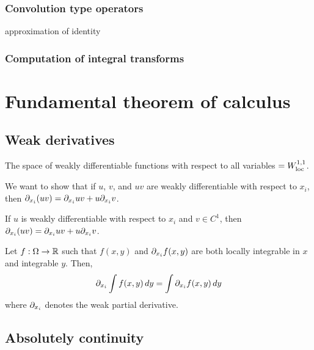 \documentclass{../note}
\begin{document}
\section{Convolution type operators}
approximation of identity

\section{Computation of integral transforms}











\part{Fundamental theorem of calculus}

\chapter{Weak derivatives}

The space of weakly differentiable functions with respect to all variables $=W_{\mathrm{loc}}^{1,1}$.

\begin{prb}
We want to show that if $u$, $v$, and $uv$ are weakly differentiable with respect to $x_i$, then $\pd_{x_i}(uv)=\pd_{x_i}uv+u\pd_{x_i}v$.
\begin{parts}
\item If $u$ is weakly differentiable with respect to $x_i$ and $v\in C^1$, then $\pd_{x_i}(uv)=\pd_{x_i}uv+u\pd_{x_i}v$.
\end{parts}
\end{prb}


\begin{prb}
Let $f:\Omega\to\mathbb{R}$
such that $f(x,y)$ and $\pd_{x_i}f(x,y)$ are both locally integrable in $x$ and integrable $y$.
Then,
\[\pd_{x_i}\int f(x,y)\,dy=\int\pd_{x_i}f(x,y)\,dy\]
where $\pd_{x_i}$ denotes the weak partial derivative.
\end{prb}





\chapter{Absolutely continuity}
\end{document}
